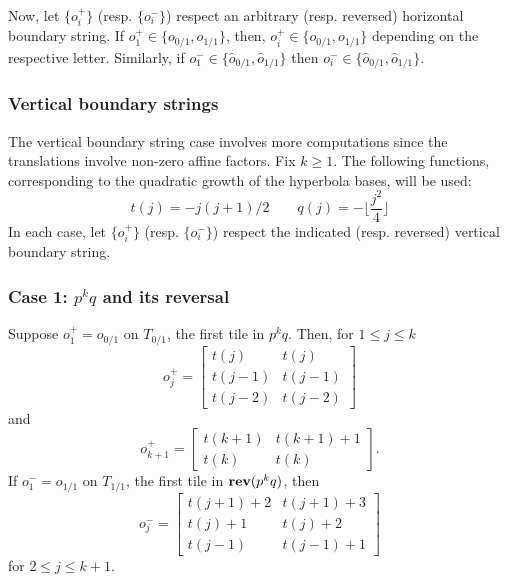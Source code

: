 \documentclass[12pt]{amsart}
\begin{document}
Now, let  $\{o_i^+\}$ (resp. $\{o_i^-\}$) respect an arbitrary (resp. reversed) horizontal boundary string.
If $o_{1}^+ \in \{ o_{0/1}, o_{1/1}\}$,
then, $o_i^+ \in \{o_{0/1}, o_{1/1}\}$ depending on the respective letter. Similarly, if $o_{1}^- \in \{ \hat{o}_{0/1}, \hat{o}_{1/1}\}$
then $o_i^- \in \{\hat{o}_{0/1}, \hat{o}_{1/1}\}$. 






\subsubsection{Vertical boundary strings} \label{subsubsec:vertical_bs_explicit}
The vertical boundary string case involves more computations since the translations involve non-zero affine factors. 
Fix $k \geq 1$.  The following functions, corresponding to the quadratic growth of the hyperbola bases, will be used:
\begin{equation}
t(j) = -j(j+1)/2 \qquad q(j) = -\lfloor \frac{j^2}{4} \rfloor
\end{equation}
In each case, let $\{o_i^+\}$  (resp. $\{o_i^-\}$) respect the indicated (resp. reversed) vertical boundary string.

\subsubsection*{Case 1: $p^{k} q$ and its reversal}
Suppose $o^+_1 = o_{0/1}$ on $T_{0/1}$, the first tile in $p^k q$. Then,  for $1 \leq j \leq k$
\begin{equation} \label{eq:explicit-forms-bs-1-a}
o^+_{j} = 
\begin{bmatrix}
t(j) &t(j) \\
t(j-1) &t(j-1) \\
t(j-2) &t(j-2) 
\end{bmatrix}
\end{equation}
and
\begin{equation} \label{eq:explicit-forms-bs-1-b}
o^+_{k+1} = 
\begin{bmatrix}
t(k+1) & t(k+1) + 1 \\
t(k) &t(k)
\end{bmatrix}.
\end{equation}
If $o^-_1 = o_{1/1}$ on $T_{1/1}$, the first tile in $\mathop{\bf rev}(p^k q)$, then
\begin{equation} \label{eq:explicit-forms-bs-1-c}
o^-_{j} = 
\begin{bmatrix}
t(j+1) + 2 & t(j+1) +3 \\
t(j) + 1 & t(j) + 2 \\
t(j-1) & t(j-1)+1
\end{bmatrix}
\end{equation}
for $2 \leq j \leq k+1$. 
\end{document}
